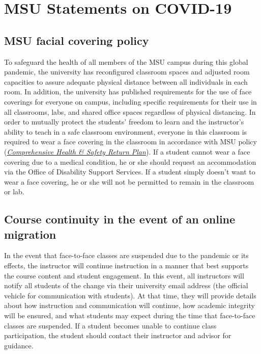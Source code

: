 
\section{MSU Statements on COVID-19}

\subsection{MSU facial covering policy} 

To safeguard the health of all members of the MSU campus during this global pandemic, the university has reconfigured classroom spaces and adjusted room capacities to assure adequate physical distance between all individuals in each room.  In addition, the university has published requirements for the use of face coverings for everyone on campus, including specific requirements for their use in all classrooms, labs, and shared office spaces regardless of physical distancing.  In order to mutually protect the students’ freedom to learn and the instructor’s ability to teach in a safe classroom environment, everyone in this classroom is required to wear a face covering in the classroom in accordance with MSU policy (\href{https://www.msstate.edu/covid19/return-plan}{\textit{Comprehensive Health \& Safety Return Plan}}).  If a student cannot wear a face covering due to a medical condition, he or she should request an accommodation via the Office of Disability Support Services.  \textcolor{red1}{If a student simply doesn’t want to wear a face covering, he or she will not be permitted to remain in the classroom or lab.}


\subsection{Course continuity in the event of an online migration} 

In the event that face-to-face classes are suspended due to the pandemic or its effects, the instructor will continue instruction in a manner that best supports the course content and student engagement. In this event, all instructors will notify all students of the change via their university email address (the official vehicle for communication with students).  At that time, they will provide details about how instruction and communication will continue, how academic integrity will be ensured, and what students may expect during the time that face-to-face classes are suspended. If a student becomes unable to continue class participation, the student should contact their instructor and advisor for guidance.
